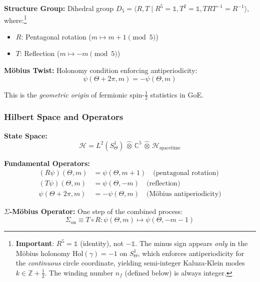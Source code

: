 \documentclass[12pt]{article}
\theoremstyle{definition}
\theoremstyle{plain}
\begin{document}
\textbf{Structure Group:} Dihedral group $D_5 = \langle R, T \mid R^5 = \mathbb{1}, T^2 = \mathbb{1}, TRT^{-1} = R^{-1} \rangle$, where:\footnote{\textbf{Important}: $R^5 = \mathbb{1}$ (identity), not $-\mathbb{1}$. The minus sign appears \emph{only} in the M\"obius holonomy $\text{Hol}(\gamma) = -1$ on $S^1_\Theta$, which enforces antiperiodicity for the \emph{continuous} circle coordinate, yielding semi-integer Kaluza-Klein modes $k \in \mathbb{Z} + \frac{1}{2}$. The winding number $n_f$ (defined below) is always integer.}
\begin{itemize}
\item $R$: Pentagonal rotation ($m \mapsto m+1 \pmod{5}$)
\item $T$: Reflection ($m \mapsto -m \pmod{5}$)
\end{itemize}

\textbf{M\"obius Twist:} Holonomy condition enforcing antiperiodicity:
\begin{equation}
\boxed{\psi(\Theta + 2\pi, m) = -\psi(\Theta, m)}
\end{equation}

This is the \textit{geometric origin} of fermionic spin-$\frac{1}{2}$ statistics in GoE.

\subsubsection{Hilbert Space and Operators}

\textbf{State Space:}
\begin{equation}
\mathcal{H} = L^2(S^1_\Theta) \,\widehat{\otimes}\, \mathbb{C}^5 \,\widehat{\otimes}\, \mathcal{H}_{\text{spacetime}}
\end{equation}

\textbf{Fundamental Operators:}
\begin{align}
(R\psi)(\Theta, m) &= \psi(\Theta, m+1) \quad \text{(pentagonal rotation)} \\
(T\psi)(\Theta, m) &= \psi(\Theta, -m) \quad \text{(reflection)} \\
\psi(\Theta + 2\pi, m) &= -\psi(\Theta, m) \quad \text{(M\"obius antiperiodicity)}
\end{align}

\textbf{$\Sigma$-M\"obius Operator:} One step of the combined process:
\begin{equation}
\boxed{\Sigma_{\text{on}} \equiv T \circ R : \psi(\Theta, m) \mapsto \psi(\Theta, -m-1)}
\end{equation}
\end{document}

